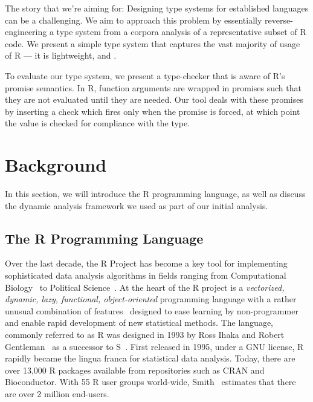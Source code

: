 \documentclass[acmsmall,review,anonymous]{acmart}\settopmatter{printfolios=true,printccs=false,printacmref=false}
\begin{document}
The story that we're aiming for:
Designing type systems for established languages can be a challenging.
We aim to approach this problem by essentially reverse-engineering a type system from a corpora analysis of a representative subset of R code.
We present a simple type system that captures the vast majority of usage of R --- it is lightweight, and .

To evaluate our type system, we present a type-checker that is aware of R's promise semantics. 
In R, function arguments are wrapped in promises such that they are not evaluated until they are needed.
Our tool deals with these promises by inserting a check which fires only when the promise is forced, at which point the value is checked for compliance with the type.


%
%
%
%
%
%
\section{Background}

In this section, we will introduce the R programming language, as well as discuss the dynamic analysis framework we used as part of our initial analysis.

%
%
%
%
\subsection{The R Programming Language}

Over the last decade, the R Project has become a key tool for implementing
sophisticated data analysis algorithms in fields ranging from Computational
Biology~\cite{R05} to Political Science~\cite{R:Keele:2008}. At the heart of
the R project is a \emph{vectorized, dynamic, lazy, functional,
  object-oriented} programming language with a rather unusual combination of
features~\cite{ecoop12} designed to ease learning by non-programmer and
enable rapid development of new statistical methods.  The language, commonly
referred to as R was designed in 1993 by Ross Ihaka and Robert
Gentleman~\cite{R96} as a successor to S~\cite{S88}.  First released in
1995, under a GNU license, R rapidly became the lingua franca for
statistical data analysis. Today, there are over 13,000 R packages available
from repositories such as CRAN and Bioconductor.  With 55 R user groups
world-wide, Smith~\cite{eco11} estimates that there are over 2 million
end-users.
\end{document}

